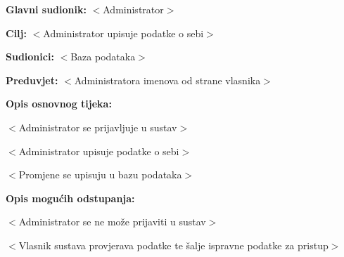 	\noindent {}
	\begin{packed_item}
		
		\item \textbf{Glavni sudionik: }$<$Administrator$>$
		\item  \textbf{Cilj:} $<$Administrator upisuje podatke o sebi$>$
		\item  \textbf{Sudionici:} $<$Baza podataka$>$
		\item  \textbf{Preduvjet:} $<$Administratora imenova od strane vlasnika$>$
		\item  \textbf{Opis osnovnog tijeka:}
		
		\item[] \begin{packed_enum}
			
			\item $<$Administrator se prijavljuje u sustav$>$
			\item $<$Administrator upisuje podatke o sebi$>$
			\item $<$Promjene se upisuju u bazu podataka$>$
			
		\end{packed_enum}
		
		\item  \textbf{Opis mogućih odstupanja:}
		
		\item[] \begin{packed_item}
			
			\item[1.a] $<$Administrator se ne može prijaviti u sustav$>$
			
			\item[] \begin{packed_enum}	
				\item $<$Vlasnik sustava provjerava podatke te šalje ispravne podatke za pristup$>$
				
			\end{packed_enum}
		\end{packed_item}
	\end{packed_item}

